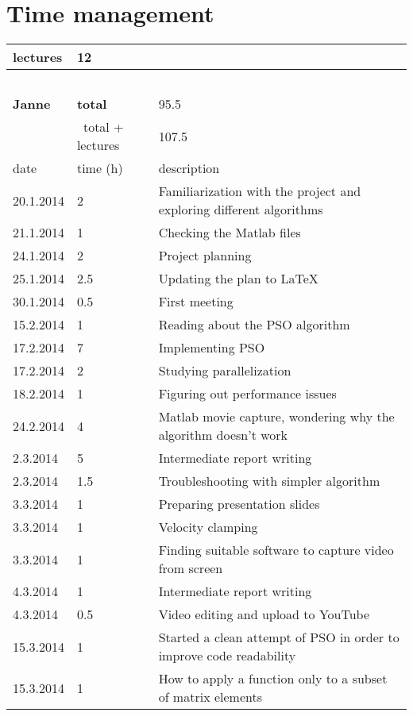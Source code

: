\documentclass[twoside]{article}
\begin{document}
\section{Time management}
\begin{longtable}{ | l | l | p{10cm} | }
\hline
	lectures & 12 & \  \\ \hline
	\  & \  & \  \\ \hline
	\textbf{Janne} & \textbf{total} & 95.5 \\ \hline
	\ & \ total + lectures & 107.5  \\ \hline
	date & time (h) & description \\ \hline
	20.1.2014 & 2 & Familiarization with the project and exploring different algorithms \\ \hline
	21.1.2014 & 1 & Checking the Matlab files \\ \hline
	24.1.2014 & 2 & Project planning \\ \hline
	25.1.2014 & 2.5 & Updating the plan to LaTeX \\ \hline
	30.1.2014 & 0.5 & First meeting \\ \hline
	15.2.2014 & 1 & Reading about the PSO algorithm \\ \hline
	17.2.2014 & 7 & Implementing PSO \\ \hline
	17.2.2014 & 2 & Studying parallelization \\ \hline
	18.2.2014 & 1 & Figuring out performance issues \\ \hline
	24.2.2014 & 4 & Matlab movie capture, wondering why the algorithm doesn't work \\ \hline
	2.3.2014 & 5 & Intermediate report writing \\ \hline
	2.3.2014 & 1.5 & Troubleshooting with simpler algorithm \\ \hline
	3.3.2014 & 1 & Preparing presentation slides \\ \hline
	3.3.2014 & 1 & Velocity clamping \\ \hline
	3.3.2014 & 1 & Finding suitable software to capture video from screen \\ \hline
	4.3.2014 & 1 & Intermediate report writing \\ \hline
	4.3.2014 & 0.5 & Video editing and upload to YouTube \\ \hline
	15.3.2014 & 1 & Started a clean attempt of PSO in order to improve code readability \\ \hline
	15.3.2014 & 1 & How  to apply a function only to a subset of matrix elements \\ \hline

\end{longtable}
\end{document}
